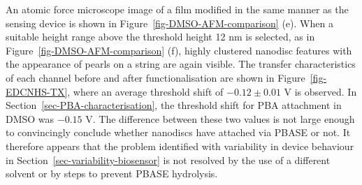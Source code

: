 \documentclass[
  a4paper,
]{scrbook}
\begin{document}
An atomic force microscope image of a film modified in the same manner
as the sensing device is shown in Figure~\ref{fig-DMSO-AFM-comparison}
(e). When a suitable height range above the threshold height 12 nm is
selected, as in Figure~\ref{fig-DMSO-AFM-comparison} (f), highly
clustered nanodisc features with the appearance of pearls on a string
are again visible. The transfer characteristics of each channel before
and after functionalisation are shown in Figure~\ref{fig-EDCNHS-TX},
where an average threshold shift of \(-0.12 \pm 0.01\) V is observed. In
Section~\ref{sec-PBA-characterisation}, the threshold shift for PBA
attachment in DMSO was \(-0.15\) V. The difference between these two
values is not large enough to convincingly conclude whether nanodiscs
have attached via PBASE or not. It therefore appears that the problem
identified with variability in device behaviour in
Section~\ref{sec-variability-biosensor} is not resolved by the use of a
different solvent or by steps to prevent PBASE hydrolysis.
\end{document}
